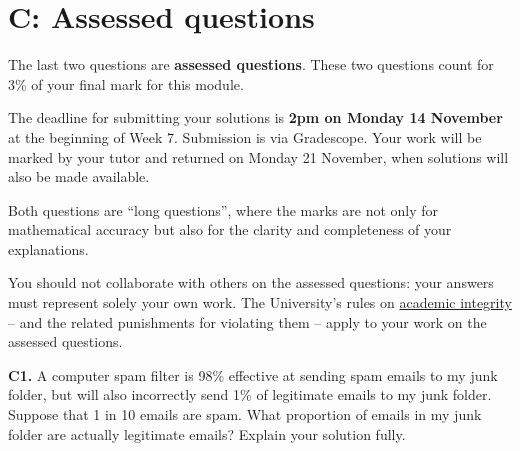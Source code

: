 \documentclass[
  a4paper,
]{book}
\theoremstyle{definition}
\theoremstyle{definition}
\theoremstyle{definition}
\theoremstyle{definition}
\theoremstyle{remark}
\begin{document}
\hypertarget{P3-assessed}{%
\section*{C: Assessed questions}\label{P3-assessed}}

The last two questions are \textbf{assessed questions}. These two questions count for 3\% of your final mark for this module.

The deadline for submitting your solutions is \textbf{2pm on Monday 14 November} at the beginning of Week 7. Submission is via Gradescope.
Your work will be marked by your tutor and returned on Monday 21 November, when solutions will also be made available.

Both questions are ``long questions'', where the marks are not only for mathematical accuracy but also for the clarity and completeness of your explanations.

You should not collaborate with others on the assessed questions: your answers must represent solely your own work. The University's rules on \href{https://library.leeds.ac.uk/info/1401/academic_skills/46/academic_integrity_and_plagiarism}{academic integrity} -- and the related punishments for violating them -- apply to your work on the assessed questions.

\textbf{C1.} A computer spam filter is 98\% effective at sending spam emails to my junk folder, but will also incorrectly send 1\% of legitimate emails to my junk folder. Suppose that 1 in 10 emails are spam. What proportion of emails in my junk folder are actually legitimate emails? Explain your solution fully.
\end{document}
